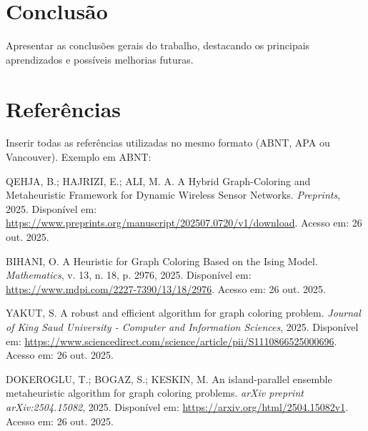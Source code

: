 \documentclass[12pt,a4paper]{article}
\begin{document}
\section{Conclusão}
Apresentar as conclusões gerais do trabalho, destacando os principais aprendizados e possíveis melhorias futuras.

\section*{Referências}

Inserir todas as referências utilizadas no mesmo formato (ABNT, APA ou Vancouver).  
Exemplo em ABNT:

\begin{thebibliography}{99}

QEHJA, B.; HAJRIZI, E.; ALI, M. A. A Hybrid Graph-Coloring and Metaheuristic Framework for Dynamic Wireless Sensor Networks. \textit{Preprints}, 2025. Disponível em: \url{https://www.preprints.org/manuscript/202507.0720/v1/download}. Acesso em: 26 out. 2025.

BIHANI, O. A Heuristic for Graph Coloring Based on the Ising Model. \textit{Mathematics}, v. 13, n. 18, p. 2976, 2025. Disponível em: \url{https://www.mdpi.com/2227-7390/13/18/2976}. Acesso em: 26 out. 2025.

YAKUT, S. A robust and efficient algorithm for graph coloring problem. \textit{Journal of King Saud University - Computer and Information Sciences}, 2025. Disponível em: \url{https://www.sciencedirect.com/science/article/pii/S1110866525000696}. Acesso em: 26 out. 2025.

DOKEROGLU, T.; BOGAZ, S.; KESKIN, M. An island-parallel ensemble metaheuristic algorithm for graph coloring problems. \textit{arXiv preprint arXiv:2504.15082}, 2025. Disponível em: \url{https://arxiv.org/html/2504.15082v1}. Acesso em: 26 out. 2025.


\end{thebibliography}
\end{document}
